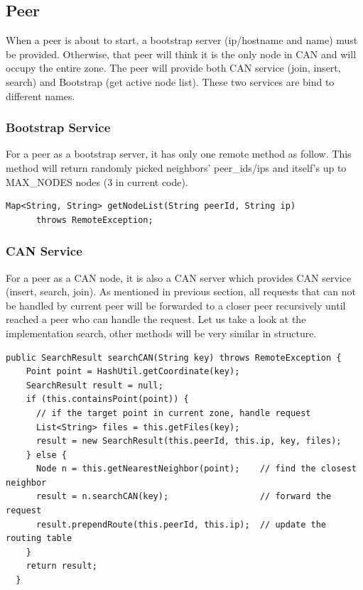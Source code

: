 \documentclass[11pt, oneside]{article}   	%
\begin{document}
\subsection{Peer}
When a peer is about to start, a bootstrap server (ip/hostname and name) must be provided. Otherwise, that peer will think it is the only node in CAN and will occupy the entire zone.
The peer will provide both CAN service (join, insert, search) and Bootstrap (get active node list). These two services are bind to different names.

\subsubsection{Bootstrap Service}
For a peer as a bootstrap server, it has only one remote method as follow. This method will return randomly picked neighbors' peer\_ids/ips and itself's up to MAX\_NODES nodes (3 in current code).

\begin{lstlisting}
Map<String, String> getNodeList(String peerId, String ip)
      throws RemoteException;
\end{lstlisting}

\subsubsection{CAN Service}
For a peer as a CAN node, it is also a CAN server which provides CAN service (insert, search, join).
As mentioned in previous section, all requests that can not be handled by current peer will be forwarded to a closer peer recursively until reached a peer who can handle the request.
Let us take a look at the implementation search, other methods will be very similar in structure.

\begin{lstlisting}
public SearchResult searchCAN(String key) throws RemoteException {
    Point point = HashUtil.getCoordinate(key);
    SearchResult result = null;
    if (this.containsPoint(point)) {
      // if the target point in current zone, handle request
      List<String> files = this.getFiles(key);
      result = new SearchResult(this.peerId, this.ip, key, files);
    } else {      
      Node n = this.getNearestNeighbor(point);    // find the closest neighbor
      result = n.searchCAN(key);                  // forward the request
      result.prependRoute(this.peerId, this.ip);  // update the routing table    
    }
    return result;
  }
\end{lstlisting}
\end{document}
